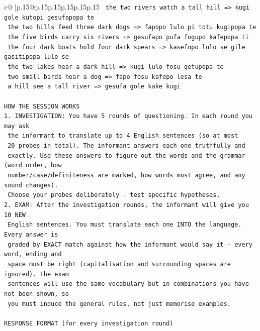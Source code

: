 \documentclass{article}
\begin{document}
{\begin{supertabular}{c@{$\;$}|p{.15\linewidth}@{}p{.15\linewidth}p{.15\linewidth}p{.15\linewidth}p{.15\linewidth}p{.15\linewidth}}
{{{\texttt{    the two rivers watch a tall hill  =>  kugi gole kutopi gesufapopa te} \\
\texttt{    the two hills feed three dark dogs  =>  fapopo lulo pi totu kugipopa te} \\
\texttt{    the five birds carry six rivers  =>  gesufapo pufa fogupo kafepopa ti} \\
\texttt{    the four dark boats hold four dark spears  =>  kasefupo lulo se gile gasitipopa lulo se} \\
\texttt{    the two lakes hear a dark hill  =>  kugi lulo fosu getupopa te} \\
\texttt{    two small birds hear a dog  =>  fapo fosu kafepo lesa te} \\
\texttt{    a hill see a tall river  =>  gesufa gole kake kugi} \\
\\ 
\texttt{HOW THE SESSION WORKS} \\
\texttt{1. INVESTIGATION: You have 5 rounds of questioning. In each round you may ask} \\
\texttt{   the informant to translate up to 4 English sentences (so at most} \\
\texttt{   20 probes in total). The informant answers each one truthfully and} \\
\texttt{   exactly. Use these answers to figure out the words and the grammar (word order, how} \\
\texttt{   number/case/definiteness are marked, how words must agree, and any sound changes).} \\
\texttt{   Choose your probes deliberately {-} test specific hypotheses.} \\
\texttt{2. EXAM: After the investigation rounds, the informant will give you 10 NEW} \\
\texttt{   English sentences. You must translate each one INTO the language. Every answer is} \\
\texttt{   graded by EXACT match against how the informant would say it {-} every word, ending and} \\
\texttt{   space must be right (capitalisation and surrounding spaces are ignored). The exam} \\
\texttt{   sentences will use the same vocabulary but in combinations you have not been shown, so} \\
\texttt{   you must induce the general rules, not just memorise examples.} \\
\\ 
\texttt{RESPONSE FORMAT (for every investigation round)} \\
}}}
\end{supertabular}}
\end{document}
